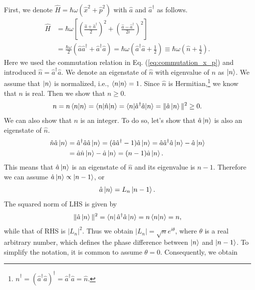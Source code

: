 First, we denote $\hat H = \hbar \omega (\hat x^2 + \hat p^2)$ with $\hat a$ and $\hat a^\dagger$ as follows.
\begin{equation}
\begin{aligned}
  \hat H &= \hbar \omega \left[\left(\frac {\hat a + \hat a^\dagger}{2}\right)^2 + \left(\frac {\hat a - \hat a^\dagger}{2i}\right)^2\right]\\
  &= \frac{\hbar \omega }{2}(\hat a\hat a^\dagger + \hat a^\dagger \hat a) = \hbar \omega \left(\hat a^\dagger \hat a + \frac 1 2\right) \equiv \hbar\omega \left(\hat n + \frac 1 2\right).
\end{aligned}
\end{equation}
Here we used the commutation relation in Eq. (\ref{eq:commutation_x_p}) and introduced $\hat n = \hat a^\dagger \hat a$. We denote an eigenstate of $\hat n$ with eigenvalue of $n$ as $\ket n$. We assume that $\ket n$ is normalized, i.e., $\braket{n|n} = 1$. Since $\hat n$ is Hermitian,\footnote{$\hat n^\dagger = (\hat a^\dagger \hat a)^\dagger = \hat a^\dagger \hat a = \hat n$.} we know that $n$ is real. Then we show that $n\geq0$.
\begin{equation}
  n = n \braket {n|n} = \braket{n|\hat n|n} = \braket {n|\hat a^\dagger \hat a|n} = \|\hat a\ket n\|^2\geq0.
  \label{eq:n_nonnegative}
\end{equation}
We can also show that $n$ is an integer. To do so, let's show that $\hat a\ket n$ is also an eigenstate of $\hat n$.
\begin{equation}
\begin{aligned}
  \hat n \hat a \ket n &= \hat a^\dagger \hat a \hat a \ket n = (\hat a\hat a^\dagger - 1)\hat a \ket n = \hat a \hat a^\dagger \hat a \ket n - \hat a \ket n \\ &= \hat a \hat n \ket n - \hat a \ket n = (n - 1)\hat a \ket n.
\end{aligned}
\end{equation}
This means that $\hat a \ket n$ is an eigenstate of $\hat n$ and its eigenvalue is $n-1$. Therefore we can assume $\hat a\ket n \propto \ket {n-1}$, or 
\begin{equation}
  \hat a\ket n = L_n\ket{n-1}.
\end{equation}
The squared norm of LHS is given by
\begin{equation}
  \| \hat a \ket n\|^2 = \bra n \hat a^\dagger \hat a \ket n = n\braket{n|n} = n,
\end{equation}
while that of RHS is $|L_n|^2$. Thus we obtain $|L_n| = \sqrt n e^{i\theta}$, where $\theta$ is a real arbitrary number, which defines the phase difference between $\ket n$ and $\ket {n-1}$. To simplify the notation, it is common to assume $\theta = 0$. Consequently, we obtain
